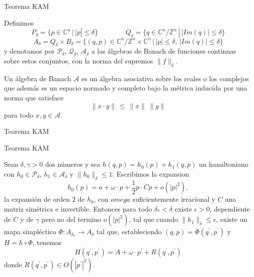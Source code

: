 \documentclass[8pt]{beamer}
\def\onehalf{{\textstyle\frac12}}
\renewcommand{\>}{\rangle}
\newcommand{\<}{\langle}
\newcommand{\be}{\begin{equation}}
\newcommand{\ee}{\end{equation}}
\begin{document}
\begin{frame}{Teorema KAM}

Definimos 
\be 
	P_{\delta} = \lbrace p \in \mathbb{C}^{n} \, | \, |p| \leq \delta \rbrace
	\qquad 
	\qquad 
	Q_{\delta} = \lbrace q \in \mathbb{C}^{n}/\mathbb{Z}^{n} \, | \, |Im(q)| \leq \delta \rbrace \nonumber
\ee
\vspace{0.1cm}
\be 
	A_{\delta} 
	= Q_{\delta} \times B_{\delta} 
	= \lbrace (q,p) \in \mathbb{C}^{n}/\mathbb{Z}^{n} \times \mathbb{C}^{n} \, | \,  |p| \leq \delta, \, |Im(q)| \leq \delta \rbrace \nonumber
\ee
y denotamos por $\mathcal{P}_{\delta}$, $\mathcal{Q}_{\delta}$, $\mathcal{A}_{\delta}$ a las álgebras de Banach de funciones continuas sobre estos conjuntos, con la norma del supremos $\parallel f \parallel_{\delta}$.

\vspace{1cm}

Un álgebra de Banach $\mathcal{A}$ es un álgebra asociativa sobre los reales o los complejos que además es un espacio normado y completo bajo la métrica inducida por una norma que satisface 
\be 
	\parallel x \cdot y \parallel \, \leq \, \parallel x \parallel \ \parallel y \parallel
	\nonumber
\ee
para todo $x,y \in \mathcal{A}$.

\end{frame}

\begin{frame}{Teorema KAM}

\begin{mybox}{Teorema KAM}

Sean $\delta, \gamma > 0$ dos números y sea $h(q,p) = h_{0}(p) + h_{1}(q,p)$ un hamiltoniano con $h_{0} \in \mathcal{P}_{\delta}$, $h_{1} \in \mathcal{A}_{\delta}$ 
y $\parallel h_{0} \parallel_{\delta} \leq 1$. Escribimos la expansion
\be 
	h_{0}(p) = a + \omega \cdot p + \onehalf p \cdot C p + o(|p|^{2}),
	\nonumber 
\ee
la expansión de orden $2$ de $h_{0}$, con $omega$ suficientemente irracional y $C$ una matriz simétrica e invertible. Entonces para todo $\delta_{\ast} <  \delta$ existe $\epsilon > 0$, dependiente de $C$ y de $\gamma$ pero no del termino $o(|p|^{2})$, tal que
cuando $\parallel h_{1} \parallel_{\delta} \leq \epsilon$, existe un mapa simpléctico $\Phi: A_{\delta_{\ast}} \rightarrow A_{\delta}$ tal que, estableciendo $(q,p) = \Phi(q^{\prime},p^{\prime})$ y $H = h \circ \Phi$, tenemos
\be 
	H(q^{\prime},p^{\prime}) = A + \omega \cdot p^{\prime} + R(q^{\prime},p^{\prime})
	\nonumber
\ee 
donde $R(q^{\prime},p^{\prime}) \in O(|p^{\prime}|^{2})$.

\end{mybox}

\end{frame}
\end{document}
